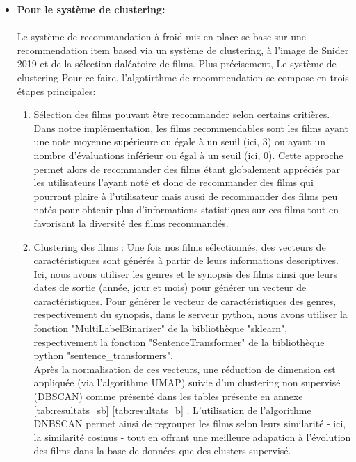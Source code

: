 \documentclass{article}
\begin{document}
\begin{itemize}
    \item \textbf{Pour le système de clustering:}\\
          $ $\\
          Le système de recommandation à froid mis en place se base sur une recommendation item based via un système de clustering, à l'image de Snider 2019 \cite{snider_unsupervised} et de la sélection daléatoire de films.
          Plus précisement, Le système de clustering
          Pour ce faire, l'algotirthme de recommendation se compose en trois étapes principales:\\
          \begin{enumerate}
              \item Sélection des films pouvant être recommander selon certains critières. Dans notre implémentation, les films recommendables sont les films ayant une note moyenne supérieure ou égale à un seuil (ici, 3) ou
                    ayant un nombre d’évaluations inférieur ou égal à un seuil (ici, 0). Cette approche permet alors de recommander des films étant globalement appréciés par les utilisateurs l'ayant noté et donc de recommander des films qui
                    pourront plaire à l'utilisateur mais aussi de recommander des films peu notés pour obtenir plus d'informations statistiques sur ces films tout en favorisant la diversité des films recommandés.
              \item Clustering des films : Une fois nos films sélectionnés, des vecteurs de caractéristiques sont générés à partir de leurs informations descriptives. Ici, nous avons utiliser les genres et le synopsis des films ainsi que leurs dates de
                    sortie (année, jour et mois) pour générer un vecteur de caractéristiques. Pour générer le vecteur de caractéristiques des genres, respectivement du synopsis, dans le serveur python, nous avons utiliser la fonction "MultiLabelBinarizer" de
                    la bibliothèque "sklearn", respectivement la fonction "SentenceTransformer" de la bibliothèque python "sentence\_transformers".\\
                    Après la normalisation de ces vecteurs, une réduction de dimension est appliquée (via l’algorithme UMAP) suivie d’un clustering non supervisé (DBSCAN) comme présenté dans les tables présente en annexe \ref{tab:resultats_sb} \ref{tab:resultats_b} . L'utilisation de l'algorithme DNBSCAN permet ainsi de regrouper
                    les films selon leurs similarité - ici, la similarité cosinus - tout en offrant une meilleure adapation à l'évolution des films dans la base de données que des clusters supervisé.

\end{enumerate}
\end{itemize}
\end{document}
